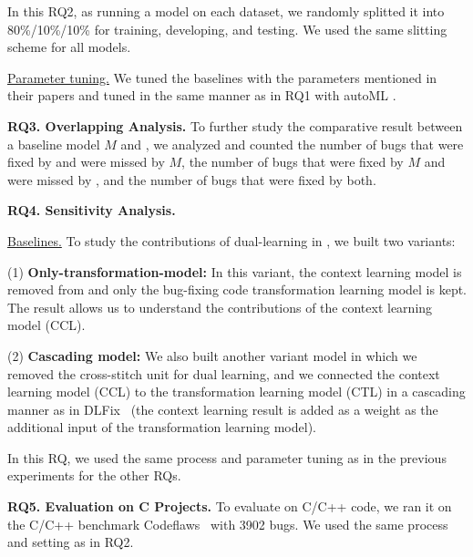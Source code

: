
In this RQ2, as running a model on each dataset, we randomly splitted
it into 80\%/10\%/10\% for training, developing, and testing. We used
the same slitting scheme for all models.


\underline{Parameter tuning.} We tuned the baselines with the
parameters mentioned in their papers and tuned {\tool} in the same
manner as in RQ1 with autoML \cite{NNI}.

{\bf RQ3. Overlapping Analysis.} To further study the comparative
result between a baseline model $M$ and {\tool}, we analyzed and
counted the number of bugs that were fixed by {\tool} and were missed
by $M$, the number of bugs that were fixed by $M$ and were missed
by {\tool}, and the number of bugs that were fixed by both.


{\bf RQ4. Sensitivity Analysis.}

\underline{Baselines.} To study the contributions of dual-learning in
{\tool}, we built two variants:

(1) \textbf{Only-transformation-model:} In this variant, the
context learning model is removed from {\tool} and only the bug-fixing
code transformation learning model is kept. The result allows us to
understand the contributions of the context learning model (CCL).


(2) \textbf{Cascading model:} We also built another variant model in
which we removed the cross-stitch unit for dual learning, and we
connected the context learning model (CCL) to the transformation
learning model (CTL) in a cascading manner as in DLFix~\cite{icse20}
(the context learning result is added as a weight
as the additional input of the transformation learning model).


In this RQ, we used the same process and parameter tuning as in the
previous experiments for the other RQs.


{\bf RQ5. Evaluation on C Projects.}  To evaluate {\tool} on C/C++
code, we ran it on the C/C++ benchmark
Codeflaws~\cite{tan2017codeflaws} with 3902 bugs. We used the same
process and setting as in RQ2.
